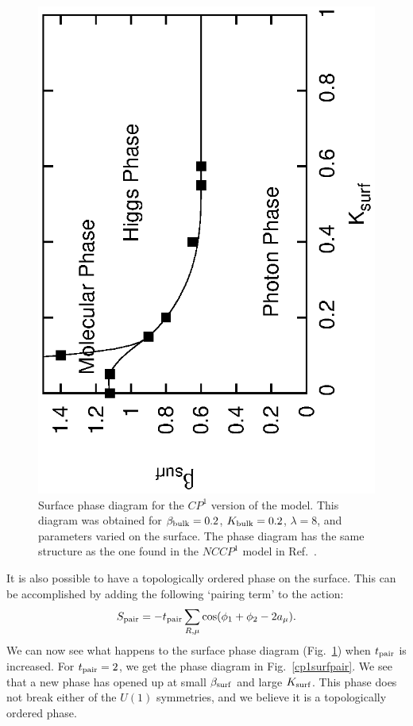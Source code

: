 \documentclass[prb,twocolumn]{revtex4-1}
\begin{document}
\begin{figure}
\includegraphics[angle=-90,width=0.9\linewidth]{figures/cp1surfphase.eps}
\caption{Surface phase diagram for the $CP^1$ version of the model. This diagram was obtained for $\beta_{\rm bulk}=0.2$, $K_{\rm bulk}=0.2$, $\lambda=8$, and parameters varied on the surface. The phase diagram has the same structure as the one found in the $NCCP^1$ model in Ref.~\cite{LesikAshvin2}. }
\label{cp1surfphase}
\end{figure}

It is also possible to have a topologically ordered phase on the surface\cite{SenthilVishwanath}. This can be accomplished by adding the following `pairing term' to the action:\cite{Max}
\begin{equation}
S_{\rm pair}=-t_{\rm pair}\sum_{R,\mu} \cos(\phi_1+\phi_2-2a_\mu).
\label{pairing}
\end{equation} 
We can now see what happens to the surface phase diagram (Fig.~\ref{cp1surfphase}) when $t_{\rm pair}$ is increased. For $t_{\rm pair}=2$, we get the phase diagram in Fig.~\ref{cp1surfpair}. We see that a new phase has opened up at small $\beta_{\rm surf}$ and large $K_{\rm surf}$. This phase does not break either of the $U(1)$ symmetries, and we believe it is a topologically ordered phase.
\end{document}
